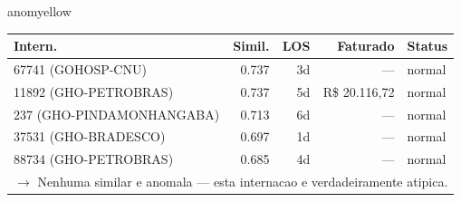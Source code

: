 \documentclass[a4paper,10pt]{article}
\begin{document}
\begin{anomalycard}[Internacao 166330 | GHO-PETROBRAS | MODERADO (z=2.19)]{anomyellow}
\begin{tabular}{l r r r l}\toprule\textbf{Intern.} & \textbf{Simil.} & \textbf{LOS} & \textbf{Faturado} & \textbf{Status} \\\midrule
67741 (GOHOSP-CNU) & 0.737 & 3d & --- & \textcolor{jcubeblue}{normal} \\
11892 (GHO-PETROBRAS) & 0.737 & 5d & R\$ 20.116,72 & \textcolor{jcubeblue}{normal} \\
237 (GHO-PINDAMONHANGABA) & 0.713 & 6d & --- & \textcolor{jcubeblue}{normal} \\
37531 (GHO-BRADESCO) & 0.697 & 1d & --- & \textcolor{jcubeblue}{normal} \\
88734 (GHO-PETROBRAS) & 0.685 & 4d & --- & \textcolor{jcubeblue}{normal} \\
\multicolumn{5}{l}{\textcolor{jcubeblue}{\small $\rightarrow$ Nenhuma similar e anomala --- esta internacao e verdadeiramente atipica.}} \\
\bottomrule\end{tabular}


\end{anomalycard}

\newpage
\end{document}
